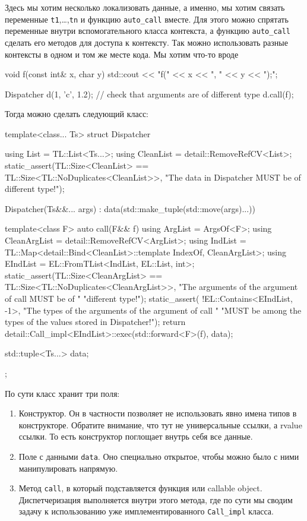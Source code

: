 Здесь мы хотим несколько локализовать данные, а именно, мы хотим связать переменные \verb"t1",\ldots,\verb"tn" и функцию \verb"auto_call" вместе.
Для этого можно спрятать переменные внутри вспомогательного класса контекста, а функцию \verb"auto_call" сделать его методов для доступа к контексту.
Так можно использовать разные контексты в одном и том же месте кода.
Мы хотим что-то вроде
\begin{cppcode}
void f(const int& x, char y) {
  std::cout << "f(" << x << ", " << y << ");\n";
}

Dispatcher d(1, 'c', 1.2); // check that arguments are of different type
d.call(f);
\end{cppcode}
Тогда можно сделать следующий класс:
\begin{cppcode}
template<class... Ts>
struct Dispatcher {
  using List = TL::List<Ts...>;
  using CleanList = detail::RemoveRefCV<List>;
  static_assert(TL::Size<CleanList> == TL::Size<TL::NoDuplicates<CleanList>>,
                "The data in Dispatcher MUST be of different type!");

  Dispatcher(Ts&&... args) : data(std::make_tuple(std::move(args)...)) {
  }

  template<class F>
  auto call(F&& f) {
    using ArgList = ArgsOf<F>;
    using CleanArgList = detail::RemoveRefCV<ArgList>;
    using IndList =
        TL::Map<detail::Bind<CleanList>::template IndexOf, CleanArgList>;
    using EIndList = EL::FromTList<IndList, EL::List, int>;
    static_assert(TL::Size<CleanArgList> ==
                      TL::Size<TL::NoDuplicates<CleanArgList>>,
                  "The arguments of the argument of call MUST be of "
                  "different type!");
    static_assert(
        !EL::Contains<EIndList, -1>,
        "The types of the arguments of the argument of call "
        "MUST be among the types of the values stored in Dispatcher!");
    return detail::Call_impl<EIndList>::exec(std::forward<F>(f), data);
  }

  std::tuple<Ts...> data;
};
\end{cppcode}
По сути класс хранит три поля:
\begin{enumerate}
\item Конструктор.
Он в частности позволяет не использовать явно имена типов в конструкторе.
Обратите внимание, что тут не универсальные ссылки, а rvalue ссылки.
То есть конструктор поглощает внутрь себя все данные.

\item Поле с данными \verb"data".
Оно специально открытое, чтобы можно было с ними манипулировать напрямую.

\item Метод \verb"call", в который подставляется функция или callable object.
Диспетчеризация выполняется внутри этого метода, где по сути мы сводим задачу к использованию уже имплементированного \verb"Call_impl" класса.
\end{enumerate}
